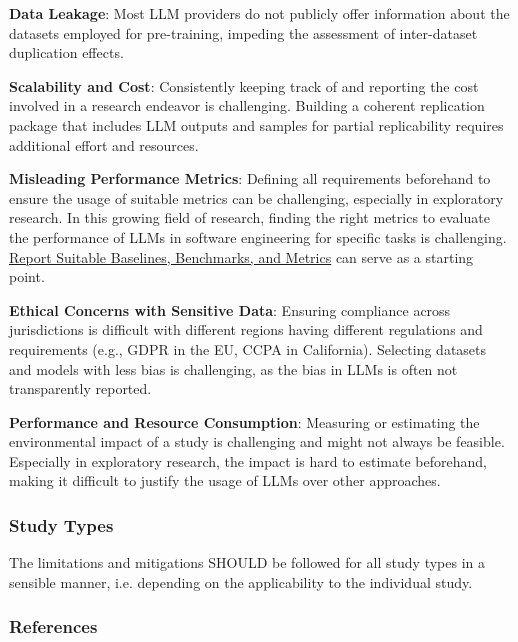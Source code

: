 \textbf{Data Leakage}:
Most LLM providers do not publicly offer information about the datasets employed for pre-training, impeding the assessment of inter-dataset duplication effects.

\textbf{Scalability and Cost}:
Consistently keeping track of and reporting the cost involved in a research endeavor is challenging.
Building a coherent replication package that includes LLM outputs and samples for partial replicability requires additional effort and resources.

\textbf{Misleading Performance Metrics}:
Defining all requirements beforehand to ensure the usage of suitable metrics can be challenging, especially in exploratory research.
In this growing field of research, finding the right metrics to evaluate the performance of LLMs in software engineering for specific tasks is challenging. \href{/guidelines/report-baselines-benchmarks-and-metrics}{Report Suitable Baselines, Benchmarks, and Metrics} can serve as a starting point.

\textbf{Ethical Concerns with Sensitive Data}:
Ensuring compliance across jurisdictions is difficult with different regions having different regulations and requirements (e.g., GDPR in the EU, CCPA in California).
Selecting datasets and models with less bias is challenging, as the bias in LLMs is often not transparently reported.

\textbf{Performance and Resource Consumption}:
Measuring or estimating the environmental impact of a study is challenging and might not always be feasible. Especially in exploratory research, the impact is hard to estimate beforehand, making it difficult to justify the usage of LLMs over other approaches.

\subsubsection{Study Types}
The limitations and mitigations SHOULD be followed for all study types in a sensible manner, i.e. depending on the applicability to the individual study.


\subsubsection{References}





